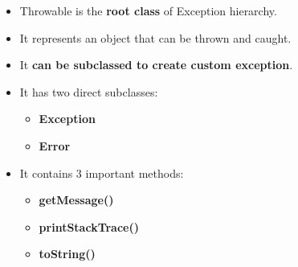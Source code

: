 \setlength{\columnsep}{3pt}
\begin{flushleft}

	\begin{itemize}
		\item Throwable is the \textbf{root class} of Exception hierarchy.
		\item It represents an object that can be thrown and caught.
		\item It \textbf{can be subclassed to create custom exception}.
		\item It has two direct subclasses:
		\begin{itemize}
			\item \textbf{Exception }
			\item \textbf{Error}
		\end{itemize}
		\item It contains 3 important methods:
		\begin{itemize}
			\item \textbf{getMessage()}
			\item \textbf{printStackTrace()}
			\item \textbf{toString()}
		\end{itemize}
		
	\end{itemize}


\end{flushleft}
\newpage


